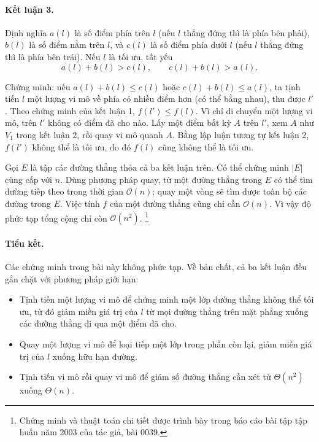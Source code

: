 \documentclass[11pt]{article}
\newcommand{\Oh}{\mathcal{O}}
\newcommand{\abs}[1]{\left|#1\right|}
\begin{document}
\paragraph{Kết luận 3.}
Định nghĩa \(a(l)\) là số điểm phía trên \(l\) (nếu \(l\) thẳng đứng thì là
phía bên phải), \(b(l)\) là số điểm nằm trên \(l\), và \(c(l)\) là số điểm
phía dưới \(l\) (nếu \(l\) thẳng đứng thì là phía bên trái). Nếu \(l\) là tối
ưu, tất yếu
\[
  a(l)+b(l)>c(l),\qquad c(l)+b(l)>a(l).
\]

Chứng minh: nếu \(a(l)+b(l)\le c(l)\) hoặc \(c(l)+b(l)\le a(l)\), ta tịnh
tiến \(l\) một lượng vi mô về phía có nhiều điểm hơn (có thể bằng nhau), thu
được \(l'\). Theo chứng minh của kết luận 1, \(f(l')\le f(l)\). Vì chỉ di
chuyển một lượng vi mô, trên \(l'\) không có điểm đã cho nào. Lấy một điểm bất
kỳ \(A\) trên \(l'\), xem \(A\) như \(V_1\) trong kết luận 2, rồi quay vi mô
quanh \(A\). Bằng lập luận tương tự kết luận 2, \(f(l')\) không thể là tối ưu,
do đó \(f(l)\) cũng không thể là tối ưu.

Gọi \(E\) là tập các đường thẳng thỏa cả ba kết luận trên. Có thể chứng minh
\(\abs{E}\) cùng cấp với \(n\). Dùng phương pháp quay, từ một đường thẳng trong
\(E\) có thể tìm đường tiếp theo trong thời gian \(\Oh(n)\); quay một vòng sẽ
tìm được toàn bộ các đường trong \(E\). Việc tính \(f\) của một đường thẳng
cũng chỉ cần \(\Oh(n)\). Vì vậy độ phức tạp tổng cộng chỉ còn \(\Oh(n^2)\).%
\footnote{Chứng minh và thuật toán chi tiết được trình bày trong báo cáo bài
tập tập huấn năm 2003 của tác giả, bài 0039.}

\paragraph{Tiểu kết.}
Các chứng minh trong bài này không phức tạp. Về bản chất, cả ba kết luận đều
gắn chặt với phương pháp giới hạn:
\begin{itemize}
  \item Tịnh tiến một lượng vi mô để chứng minh một lớp đường thẳng không thể
  tối ưu, từ đó giảm miền giá trị của \(l\) từ mọi đường thẳng trên mặt phẳng
  xuống các đường thẳng đi qua một điểm đã cho.
  \item Quay một lượng vi mô để loại tiếp một lớp trong phần còn lại, giảm miền
  giá trị của \(l\) xuống hữu hạn đường.
  \item Tịnh tiến vi mô rồi quay vi mô để giảm số đường thẳng cần xét từ
  \(\Theta(n^2)\) xuống \(\Theta(n)\).
\end{itemize}
\end{document}
